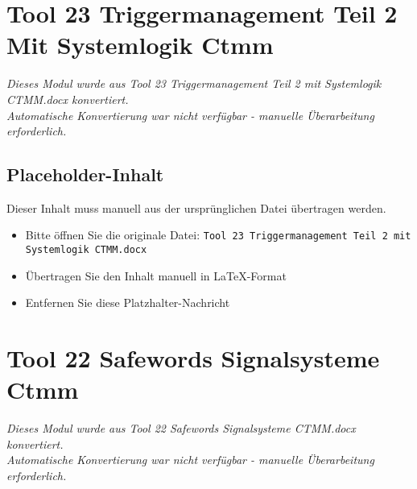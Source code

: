 \section{Tool 23 Triggermanagement Teil 2 Mit Systemlogik Ctmm}
\label{sec:tool-23-triggermanagement-teil-2-mit-systemlogik-ctmm}

\begin{center}
\textit{Dieses Modul wurde aus Tool 23 Triggermanagement Teil 2 mit Systemlogik CTMM.docx konvertiert.\\
Automatische Konvertierung war nicht verfügbar - manuelle Überarbeitung erforderlich.}
\end{center}


\subsection{Placeholder-Inhalt}

Dieser Inhalt muss manuell aus der ursprünglichen Datei übertragen werden.

\begin{itemize}
\item Bitte öffnen Sie die originale Datei: \texttt{Tool 23 Triggermanagement Teil 2 mit Systemlogik CTMM.docx}
\item Übertragen Sie den Inhalt manuell in LaTeX-Format
\item Entfernen Sie diese Platzhalter-Nachricht
\end{itemize}




\section{Tool 22 Safewords Signalsysteme Ctmm}
\label{sec:tool-22-safewords-signalsysteme-ctmm}

\begin{center}
\textit{Dieses Modul wurde aus Tool 22 Safewords Signalsysteme CTMM.docx konvertiert.\\
Automatische Konvertierung war nicht verfügbar - manuelle Überarbeitung erforderlich.}
\end{center}

